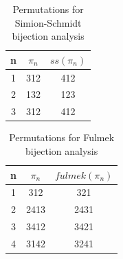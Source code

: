 \documentclass[12pt]{article}
\begin{document}
\begin{table}[H]
\caption{Permutations for Simion-Schmidt bijection analysis}
\centering
\begin{tabular}{c | c c}
\hline\hline
n & $\pi_n$ & $ss(\pi_n)$ \\ [0.5ex]
\hline
1 & 312 & 412 \\
2 & 132 & 123 \\
3 & 312 & 412 \\
\hline
\end{tabular}
\label{table:SSPerms}
\end{table}

\begin{table}[H]
\caption{Permutations for Fulmek bijection analysis}
\centering
\begin{tabular}{c | c c}
\hline\hline
n & $\pi_n$ & $fulmek(\pi_n)$ \\ [0.5ex]
\hline
1 & 312 & 321 \\
2 & 2413 & 2431\\
3 & 3412 & 3421\\
4 & 3142 & 3241\\
\hline
\end{tabular}
\label{table:FulmekPerms}
\end{table}
\newpage

\end{document}
